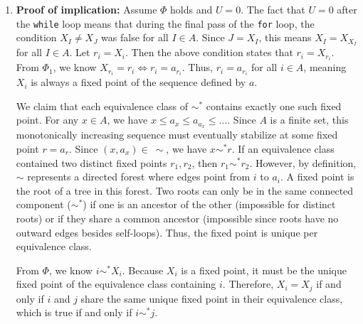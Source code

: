 \documentclass[10pt,a4paper]{article}
\begin{document}
\begin{enumerate}[label=\fbox{\arabic*}]
\begin{enumerate}[label=(\arabic*)]
\begin{enumerate}
            \item[(b)] \textbf{Proof of implication:}
            Assume $\Phi$ holds and $U = 0$. 
            The fact that $U = 0$ after the \verb|while| loop means that during the final pass of the \verb|for| loop, the condition $X_I \neq X_J$ was false for all $I \in A$. Since $J = X_I$, this means $X_I = X_{X_I}$ for all $I \in A$.
            Let $r_i = X_i$. Then the above condition states that $r_i = X_{r_i}$.
            From $\Phi_1$, we know $X_{r_i} = r_i \Leftrightarrow r_i = a_{r_i}$. Thus, $r_i = a_{r_i}$ for all $i \in A$, meaning $X_i$ is always a fixed point of the sequence defined by $a$.

            We claim that each equivalence class of $\sim^*$ contains exactly one such fixed point. 
            For any $x \in A$, we have $x \le a_x \le a_{a_x} \le \dots$. Since $A$ is a finite set, this monotonically increasing sequence must eventually stabilize at some fixed point $r = a_r$. Since $(x, a_x) \in \ \sim$, we have $x \sim^* r$. 
            If an equivalence class contained two distinct fixed points $r_1, r_2$, then $r_1 \sim^* r_2$. However, by definition, $\sim$ represents a directed forest where edges point from $i$ to $a_i$. A fixed point is the root of a tree in this forest. Two roots can only be in the same connected component ($\sim^*$) if one is an ancestor of the other (impossible for distinct roots) or if they share a common ancestor (impossible since roots have no outward edges besides self-loops). Thus, the fixed point is unique per equivalence class.

            From $\Phi$, we know $i \sim^* X_i$. Because $X_i$ is a fixed point, it must be the unique fixed point of the equivalence class containing $i$.
            Therefore, $X_i = X_j$ if and only if $i$ and $j$ share the same unique fixed point in their equivalence class, which is true if and only if $i \sim^* j$.
          \end{enumerate}
        \end{enumerate}

\end{enumerate}
\end{document}
